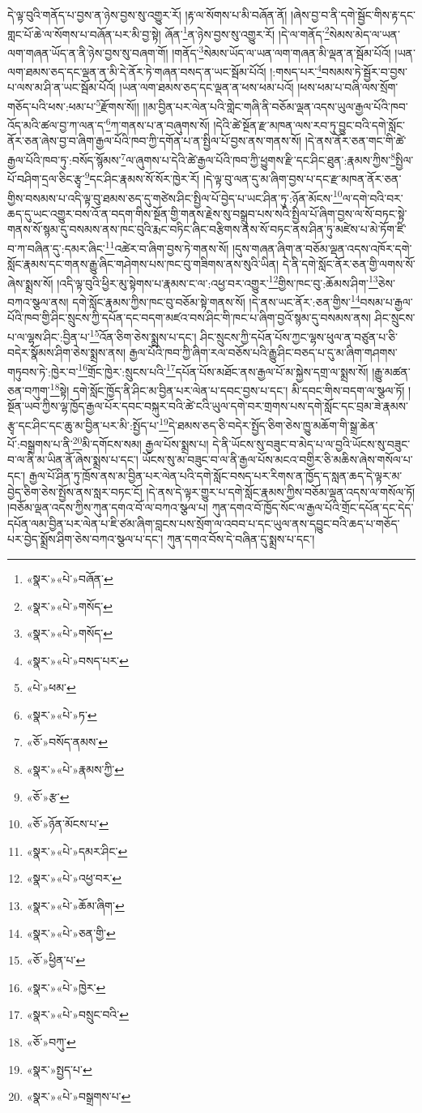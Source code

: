 དེ་ལྟ་བུའི་གནོད་པ་བྱས་ན་ཉེས་བྱས་སུ་འགྱུར་རོ། །རྟ་ལ་སོགས་པ་མི་བཞོན་ནོ། །ཞེས་བྱ་བ་ནི་དགེ་སྦྱོང་གིས་རྟ་དང་གླང་པོ་ཆེ་ལ་སོགས་པ་བཞོན་པར་མི་བྱ་སྟེ། ཞོན་\footnote{«སྣར་»«པེ་»བཞོན་}ན་ཉེས་བྱས་སུ་འགྱུར་རོ། །དེ་ལ་གནོད་\footnote{«སྣར་»«པེ་»གསོད་}སེམས་མེད་ལ་ཡན་ལག་གཞན་ཡོད་ན་ནི་ཉེས་བྱས་སུ་བཞག་གོ། །གནོད་\footnote{«སྣར་»«པེ་»གསོད་}སེམས་ཡོད་ལ་ཡན་ལག་གཞན་མི་ལྡན་ན་སྦོམ་པོའོ། །ཡན་ལག་ཐམས་ཅད་དང་ལྡན་ན་མི་དེ་ནོར་ཏེ་གཞན་བསད་ན་ཡང་སྦོམ་པོའོ། །:གསད་པར་\footnote{«སྣར་»«པེ་»བསད་པར་}བསམས་ཏེ་སྦྱོར་བ་བྱས་པ་ལས་མ་ཤི་ན་ཡང་སྦོམ་པོའོ། །ཡན་ལག་ཐམས་ཅད་དང་ལྡན་ན་ཕས་ཕམ་པའོ། །ཕས་ཕམ་པ་བཞི་ལས་སྲོག་གཅོད་པའི་ཕས་:ཕམ་པ་\footnote{«པེ་»ཕམ་}རྫོགས་སོ།། །།མ་བྱིན་པར་ལེན་པའི་གླེང་གཞི་ནི་བཅོམ་ལྡན་འདས་ཡུལ་རྒྱལ་པོའི་ཁབ་འོད་མའི་ཚལ་བྱ་ཀ་ལན་ད་\footnote{«སྣར་»«པེ་»ཏ་}ཀ་གནས་པ་ན་བཞུགས་སོ། །དེའི་ཚེ་སྔོན་རྫ་མཁན་ལས་རབ་ཏུ་བྱུང་བའི་དགེ་སློང་ནོར་ཅན་ཞེས་བྱ་བ་ཞིག་རྒྱལ་པོའི་ཁབ་ཀྱི་དགོན་པ་ན་སྤྱིལ་པོ་བྱས་ནས་གནས་སོ། །དེ་ནས་ནོར་ཅན་གང་གི་ཚེ་རྒྱལ་པོའི་ཁབ་ཏུ་:བསོད་སྙོམས་\footnote{«ཅོ་»བསོད་ནམས་}ལ་ཞུགས་པ་དེའི་ཚེ་རྒྱལ་པོའི་ཁབ་ཀྱི་ཕྱུགས་རྫི་དང་ཤིང་ཐུན་:རྣམས་ཀྱིས་\footnote{«སྣར་»«པེ་»རྣམས་ཀྱི་}སྤྱིལ་པོ་བཤིག་དྲལ་ཅིང་རྩྭ་\footnote{«ཅོ་»རྩ་}དང་ཤིང་རྣམས་སོ་སོར་ཁྱེར་རོ། །དེ་ལྟ་བུ་ལན་དུ་མ་ཞིག་བྱས་པ་དང་རྫ་མཁན་ནོར་ཅན་གྱིས་བསམས་པ་འདི་ལྟ་བུ་ཐམས་ཅད་དུ་གཙེས་ཤིང་སྤྱིལ་པོ་བྱེད་པ་ཡང་ཤིན་ཏུ་:ཉོན་མོངས་\footnote{«ཅོ་»ཉོན་མོངས་པ་}ལ་དགེ་བའི་བར་ཆད་དུ་ཡང་འགྱུར་བས་འོ་ན་བདག་གིས་སྔོན་གྱི་གནས་རྗེས་སུ་བསྒྲུབ་པས་སའི་སྤྱིལ་པོ་ཞིག་བྱས་ལ་སོ་བཏང་སྟེ་གནས་སོ་སྙམ་དུ་བསམས་ནས་ཁང་བུའི་རྨང་བཏིང་ཞིང་བརྩིགས་ནས་སོ་བཏང་ནས་ཤིན་ཏུ་མཛེས་པ་མེ་ཏོག་ཛི་བ་ཀ་བཞིན་དུ་:དམར་ཞིང་\footnote{«སྣར་»«པེ་»དམར་ཤིང་}འཚེར་བ་ཞིག་བྱས་ཏེ་གནས་སོ། །དུས་གཞན་ཞིག་ན་བཅོམ་ལྡན་འདས་འཁོར་དགེ་སློང་རྣམས་དང་གནས་རྒྱུ་ཞིང་གཤེགས་པས་ཁང་བུ་གཟིགས་ནས་སུའི་ཡིན། དེ་ནི་དགེ་སློང་ནོར་ཅན་གྱི་ལགས་སོ་ཞེས་སྨྲས་སོ། །འདི་ལྟ་བུའི་ཕྱིར་མུ་སྟེགས་པ་རྣམས་ང་ལ་:འཕྱ་བར་འགྱུར་\footnote{«སྣར་»«པེ་»འཕྱ་བར་}གྱིས་ཁང་བུ་:ཆོམས་ཤིག་\footnote{«སྣར་»«པེ་»ཆོམ་ཞིག་}ཅེས་བཀའ་སྩལ་ནས། དགེ་སློང་རྣམས་ཀྱིས་ཁང་བུ་བཅོམ་སྟེ་གནས་སོ། །དེ་ནས་ཡང་ནོར་:ཅན་གྱིས་\footnote{«སྣར་»«པེ་»ཅན་གྱི་}བསམ་པ་རྒྱལ་པོའི་ཁབ་གྱི་ཤིང་སྲུངས་ཀྱི་དཔོན་དང་བདག་མཛའ་བས་ཤིང་གི་ཁང་པ་ཞིག་བྱའོ་སྙམ་དུ་བསམས་ནས། ཤིང་སྲུངས་པ་ལ་ལྷས་ཤིང་:བྱིན་པ་\footnote{«ཅོ་»ཕྱིན་པ་}འོན་ཅིག་ཅེས་སྨྲས་པ་དང་། ཤིང་སྲུངས་ཀྱི་དཔོན་པོས་ཀྱང་ལྷས་ཕུལ་ན་བཙུན་པ་ཅི་བདེར་སྣོམས་ཤིག་ཅེས་སྨྲས་ནས། རྒྱལ་པོའི་ཁབ་ཀྱི་ཞིག་རལ་བཅོས་པའི་རྒྱུ་ཤིང་བཅད་པ་དུ་མ་ཞིག་གཤགས་གཏུབས་ཏེ་:ཁྱེར་བ་\footnote{«སྣར་»«པེ་»ཁྱེར་}གྲོང་ཁྱེར་:སྲུངས་པའི་\footnote{«སྣར་»«པེ་»བསྲུང་བའི་}དཔོན་པོས་མཐོང་ནས་རྒྱལ་པོ་མ་སྐྱེས་དགྲ་ལ་སྨྲས་སོ། །རྒྱུ་མཚན་ཅན་བཀུག་\footnote{«ཅོ་»བཀུ་}སྟེ། དགེ་སློང་ཁྱོད་ནི་ཤིང་མ་བྱིན་པར་ལེན་པ་དབང་བྱས་པ་དང་། མི་དབང་གིས་བདག་ལ་སྩལ་ཏོ། །སྔོན་ཡབ་ཀྱིས་ལྷ་ཁྱོད་རྒྱལ་པོར་དབང་བསྐུར་བའི་ཚེ་ངའི་ཡུལ་དགེ་བར་གྲགས་པས་དགེ་སློང་དང་བྲམ་ཟེ་རྣམས་རྩྭ་དང་ཤིང་དང་ཆུ་མ་བྱིན་པར་མི་:སྤྱོད་པ་\footnote{«སྣར་»སྤྱད་པ་}དེ་ཐམས་ཅད་ཅི་བདེར་སྤྱོད་ཅིག་ཅེས་ཁྱུ་མཆོག་གི་སྒྲ་ཆེན་པོ་:བསྒྲགས་པ་ནི་\footnote{«སྣར་»«པེ་»བསྒྲགས་པ་}མི་དགོངས་སམ། རྒྱལ་པོས་སྨྲས་པ། དེ་ནི་ཡོངས་སུ་བཟུང་བ་མེད་པ་ལ་བྱའི་ཡོངས་སུ་བཟུང་བ་ལ་ནི་མ་ཡིན་ནོ་ཞེས་སྨྲས་པ་དང་། ཡོངས་སུ་མ་བཟུང་བ་ལ་ནི་རྒྱལ་པོས་མངའ་བགྱིར་ཅི་མཆིས་ཞེས་གསོལ་པ་དང་། རྒྱལ་པོ་ཤིན་ཏུ་ཁྲོས་ནས་མ་བྱིན་པར་ལེན་པའི་དགེ་སློང་བསད་པར་རིགས་ན་ཁྱོད་ད་སླན་ཆད་དེ་ལྟར་མ་བྱེད་ཅིག་ཅེས་སྤྱོས་ནས་སླར་བཏང་ངོ། །དེ་ནས་དེ་ལྟར་གྱུར་པ་དགེ་སློང་རྣམས་ཀྱིས་བཅོམ་ལྡན་འདས་ལ་གསོལ་ཏོ། །བཅོམ་ལྡན་འདས་ཀྱིས་ཀུན་དགའ་བོ་ལ་བཀའ་སྩལ་པ། ཀུན་དགའ་བོ་ཁྱོད་སོང་ལ་རྒྱལ་པོའི་གྲོང་དཔོན་དང་དེད་དཔོན་ལམ་བྱིན་པར་ལེན་པ་ཇི་ཙམ་ཞིག་བླངས་པས་སྲོག་ལ་འབབ་པ་དང་ཡུལ་ནས་དབྱུང་བའི་ཆད་པ་གཅོད་པར་བྱེད་སྨྲོས་ཤིག་ཅེས་བཀའ་སྩལ་པ་དང་། ཀུན་དགའ་བོས་དེ་བཞིན་དུ་སྨྲས་པ་དང་། 